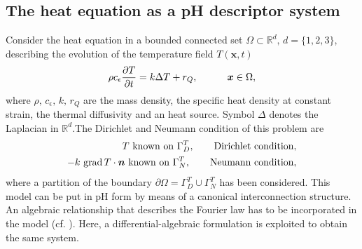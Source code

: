 \subsection{The heat equation as a pH descriptor system}\label{sec:phheat}
Consider the heat equation in a bounded connected set $\Omega \subset \mathbb{R}^d, \, d=\{1,2,3\}$, describing the evolution of the temperature field $T(\bm{x}, t)$
\begin{equation}\label{eq:heatEq}
\rho c_\epsilon \diffp{T}{t} = k \Delta T + r_Q, \qquad \quad \bm{x} \in \Omega,
\end{equation}
where $\rho,\, c_\epsilon,\, k,\, r_Q$ are the mass density, the specific heat density at constant strain, the thermal diffusivity and an heat source. Symbol $\Delta$ denotes the Laplacian in $\mathbb{R}^d$.The Dirichlet and Neumann condition of this problem are 
\begin{equation*}
	\begin{aligned}
	T \text{ known on } \Gamma_D^T, \qquad \text{Dirichlet condition}, \\
	-k \, \operatorname*{grad} T \cdot \bm{n} \text{ known on } \Gamma_N^T, \qquad \text{Neumann condition},
	\end{aligned}
\end{equation*}
where a partition of the boundary $\partial \Omega = \Gamma_D^T \cup \Gamma_N^T$ has been considered. This model can be put in pH form by means of a canonical interconnection structure. An algebraic relationship that describes the Fourier law has to be incorporated in the model (cf. \cite[Chapter 2]{kotyczka2019numerical}). Here, a differential-algebraic formulation is exploited to obtain the same system. \\

